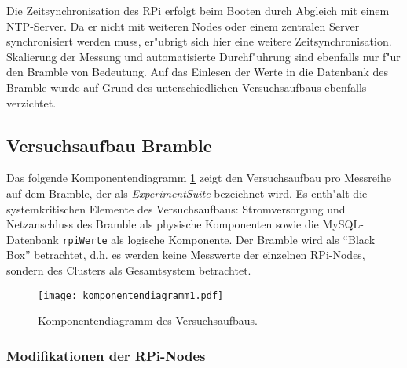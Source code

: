Die Zeitsynchronisation des RPi erfolgt beim Booten durch Abgleich mit einem NTP-Server. Da er nicht mit weiteren Nodes oder einem zentralen Server synchronisiert werden muss, er"ubrigt sich hier eine weitere Zeitsynchronisation. Skalierung der Messung und automatisierte Durchf"uhrung sind ebenfalls nur f"ur den Bramble von Bedeutung. Auf das Einlesen der Werte in die Datenbank des Bramble wurde auf Grund des unterschiedlichen Versuchsaufbaus ebenfalls verzichtet. 

\subsection{Versuchsaufbau Bramble}\label{Bramble-Versuchsaufbau}

Das folgende Komponentendiagramm \ref{fig:Komponentendiagramm} zeigt den Versuchsaufbau pro Messreihe auf dem Bramble, der als \textit{ExperimentSuite} bezeichnet wird. Es enth"alt die systemkritischen Elemente des Versuchsaufbaus: Stromversorgung und Netzanschluss des Bramble als physische Komponenten sowie die MySQL-Datenbank \texttt{rpiWerte} als logische Komponente. Der Bramble wird als "`Black Box"' betrachtet, d.h. es werden keine Messwerte der einzelnen RPi-Nodes, sondern des Clusters als Gesamtsystem betrachtet.  
\begin{figure}[htb]
  \centering
  \texttt{[image: komponentendiagramm1.pdf]}\\ 
  \caption{Komponentendiagramm des Versuchsaufbaus.}
  \label{fig:Komponentendiagramm}		
\end{figure}

\subsubsection{Modifikationen der RPi-Nodes}

